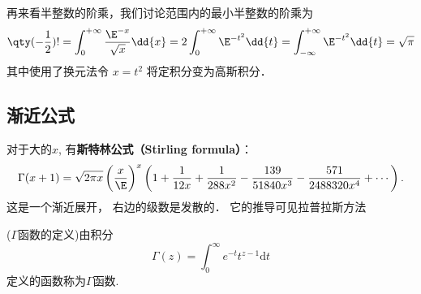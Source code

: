 再来看半整数的阶乘，我们讨论范围内的最小半整数的阶乘为 
\begin{equation}
\qty(-\frac12) ! = \int_0^{+\infty} \frac{\E^{-x}}{\sqrt x}\dd{x} = 2\int_0^{+\infty} \E^{-t^2} \dd{t} = \int_{-\infty}^{+\infty} \E^{-t^2} \dd{t} = \sqrt{\pi}
\end{equation}
其中使用了换元法令 $x = t^2$ 将定积分变为高斯积分．

\subsection{渐近公式}
对于大的$x$, 有\textbf{斯特林公式（Stirling formula）}：
$$
\Gamma(x+1)
  =\sqrt{2\pi x}\left({x\over \E}\right)^x
  \left(
   1
   +{1\over12x}
   +{1\over288x^2}
   -{139\over51840x^3}
   -{571\over2488320x^4}
   + \cdots
  \right).
$$
这是一个渐近展开， 右边的级数是发散的． 它的推导可见拉普拉斯方法

\begin{definition}
		($\Gamma$函数的定义)由积分
		\begin{equation}
			\Gamma(z)=\int_{0}^{\infty}e^{-t}t^{z-1}\mathrm{d}t\label{Gamma_eq6}
		\end{equation}
		定义的函数称为$\Gamma$函数.
	\end{definition}

